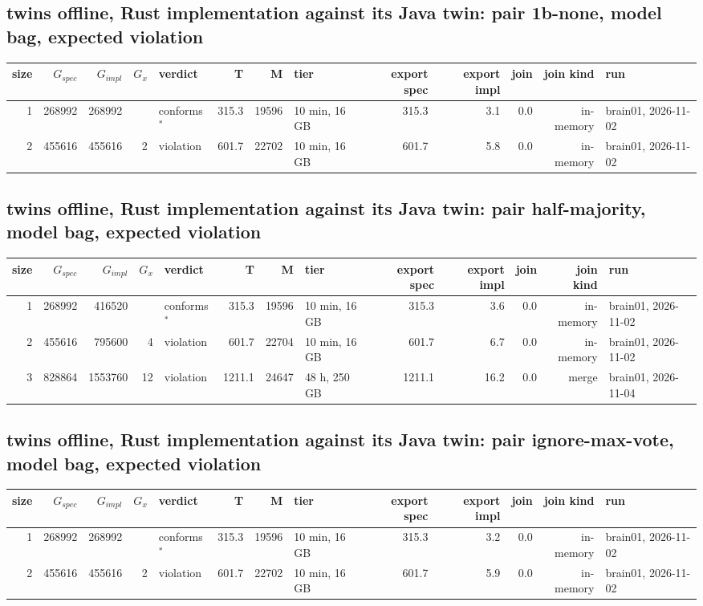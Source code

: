 \documentclass[10pt]{article}
\begin{document}
\subsection*{twins offline, Rust implementation against its Java twin: pair \textsf{1b-none}, model bag, expected violation}
\begin{longtable}{@{}rrrrlrrlrrrrl@{}}
\toprule
size & $G_{\mathit{spec}}$ & $G_{\mathit{impl}}$ & $G_x$ & verdict & T & M & tier & export spec & export impl & join & join kind & run \\
\midrule
\endhead
\color{red} 1 & 268992 & 268992 &  & conforms$^{\ast}$ & 315.3 & 19596 & 10 min, 16 GB & 315.3 & 3.1 & 0.0 & in-memory & brain01, 2026-11-02 \\
\color{red} 2 & 455616 & 455616 & 2 & violation & 601.7 & 22702 & 10 min, 16 GB & 601.7 & 5.8 & 0.0 & in-memory & brain01, 2026-11-02 \\
\bottomrule
\end{longtable}
\subsection*{twins offline, Rust implementation against its Java twin: pair \textsf{half-majority}, model bag, expected violation}
\begin{longtable}{@{}rrrrlrrlrrrrl@{}}
\toprule
size & $G_{\mathit{spec}}$ & $G_{\mathit{impl}}$ & $G_x$ & verdict & T & M & tier & export spec & export impl & join & join kind & run \\
\midrule
\endhead
\color{red} 1 & 268992 & 416520 &  & conforms$^{\ast}$ & 315.3 & 19596 & 10 min, 16 GB & 315.3 & 3.6 & 0.0 & in-memory & brain01, 2026-11-02 \\
\color{red} 2 & 455616 & 795600 & 4 & violation & 601.7 & 22704 & 10 min, 16 GB & 601.7 & 6.7 & 0.0 & in-memory & brain01, 2026-11-02 \\
\color{blue} 3 & 828864 & 1553760 & 12 & violation & 1211.1 & 24647 & 48 h, 250 GB & 1211.1 & 16.2 & 0.0 & merge & brain01, 2026-11-04 \\
\bottomrule
\end{longtable}
\subsection*{twins offline, Rust implementation against its Java twin: pair \textsf{ignore-max-vote}, model bag, expected violation}
\begin{longtable}{@{}rrrrlrrlrrrrl@{}}
\toprule
size & $G_{\mathit{spec}}$ & $G_{\mathit{impl}}$ & $G_x$ & verdict & T & M & tier & export spec & export impl & join & join kind & run \\
\midrule
\endhead
\color{red} 1 & 268992 & 268992 &  & conforms$^{\ast}$ & 315.3 & 19596 & 10 min, 16 GB & 315.3 & 3.2 & 0.0 & in-memory & brain01, 2026-11-02 \\
\color{red} 2 & 455616 & 455616 & 2 & violation & 601.7 & 22702 & 10 min, 16 GB & 601.7 & 5.9 & 0.0 & in-memory & brain01, 2026-11-02 \\
\bottomrule
\end{longtable}
\end{document}
